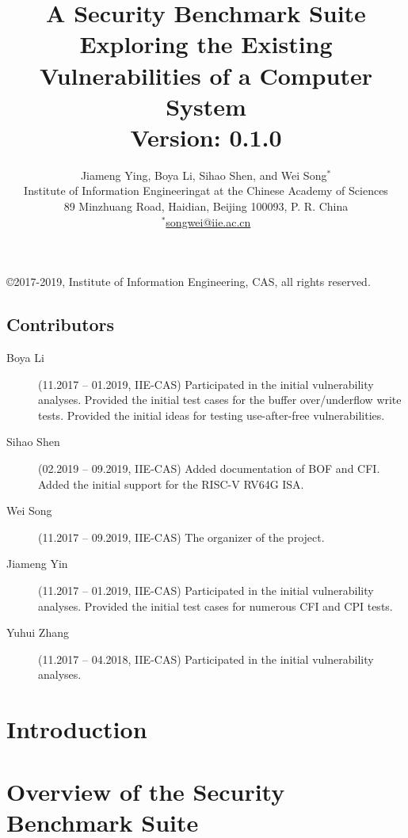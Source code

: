 \documentclass[a4paper]{book}
\begin{document}
\title{\textbf{A Security Benchmark Suite Exploring the Existing Vulnerabilities of a Computer System} \\ \large{Version: 0.1.0}}

\author{Jiameng Ying, Boya Li, Sihao Shen, and Wei Song$^*$\\
\small{Institute of Information Engineeringat at the Chinese Academy of Sciences}\\
\small{89 Minzhuang Road, Haidian, Beijing 100093, P. R. China}\\
\small{$^*$\url{songwei@iie.ac.cn}}}

\maketitle

\copyright 2017-2019, Institute of Information Engineering, CAS, all rights reserved.

\section*{Contributors}

\begin{description}
\item[Boya Li]
  (11.2017 -- 01.2019, IIE-CAS)
  Participated in the initial vulnerability analyses.
  Provided the initial test cases for the buffer over/underflow write tests.
  Provided the initial ideas for testing use-after-free vulnerabilities.
\item[Sihao Shen]
  (02.2019 -- 09.2019, IIE-CAS)
  Added documentation of BOF and CFI.
  Added the initial support for the RISC-V RV64G ISA.
\item[Wei Song]
  (11.2017 -- 09.2019, IIE-CAS)
  The organizer of the project. 
\item[Jiameng Yin]
  (11.2017 -- 01.2019, IIE-CAS)
  Participated in the initial vulnerability analyses.
  Provided the initial test cases for numerous CFI and CPI tests.
\item[Yuhui Zhang]
  (11.2017 -- 04.2018, IIE-CAS)
  Participated in the initial vulnerability analyses.
\end{description}

\tableofcontents
\newpage

\chapter{Introduction}

\chapter{Overview of the Security Benchmark Suite}
\end{document}
